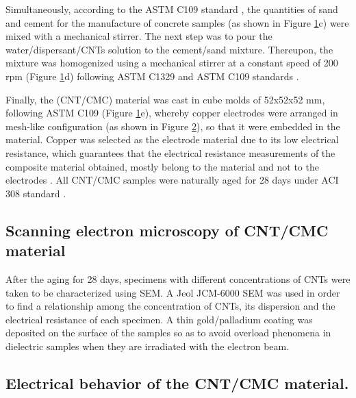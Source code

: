 \documentclass[twocolumn]{bmcart}%
\begin{document}
\begin{figure}[h!]
  \caption{
      }
   \label{fig1}
      \end{figure}



Simultaneously, according to the ASTM C109 standard \cite{Qiao2012}, the quantities of sand and cement for the manufacture of concrete samples (as shown in Figure \ref{fig1}c) were mixed with a mechanical stirrer. The next step was to pour the water/dispersant/CNTs solution to the cement/sand mixture.  Thereupon, the mixture was homogenized using a mechanical stirrer at a constant speed of 200 rpm (Figure \ref{fig1}d) following ASTM C1329 and ASTM C109 standards \cite{Collins2012, AmericanSocietyforTestingandMaterials2014}.

\begin{figure}[h!]
  \caption{
  \label{fig2}
      }
      \end{figure}


Finally, the  (CNT/CMC) material was cast in cube molds of 52x52x52 mm, following ASTM C109 \cite{ASTMC1092000} (Figure \ref{fig1}e), whereby copper electrodes were arranged in mesh-like configuration (as shown in Figure \ref{fig2}), so that it were embedded in the material. Copper was selected as the electrode material due to its low electrical resistance, which guarantees that the electrical resistance measurements of the composite material obtained, mostly belong to the material and not to the electrodes \cite{Kim2016}. All CNT/CMC samples were naturally aged for 28 days under ACI 308 standard \cite{ACICommittee3082016}.

\subsection{Scanning electron microscopy of CNT/CMC material}
After the aging for 28 days, specimens with different concentrations of CNTs were taken to be characterized using SEM. A Jeol JCM-6000 SEM was used in order to find a relationship among the concentration of CNTs, its dispersion and the electrical resistance of each specimen. A thin gold/palladium coating was deposited on the surface of the samples so as to avoid overload phenomena in dielectric samples when they are irradiated with the electron beam.

\subsection{Electrical behavior of the CNT/CMC material.}
\end{document}
